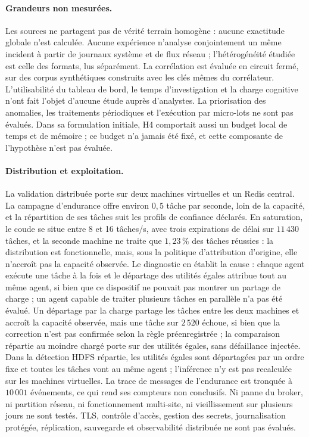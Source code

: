 \paragraph{Grandeurs non mesurées.}
Les sources ne partagent pas de vérité terrain homogène : aucune exactitude globale n'est
calculée. Aucune expérience n'analyse conjointement un même incident à partir de journaux
système et de flux réseau ; l'hétérogénéité étudiée est celle des formats, lus séparément.
La corrélation est évaluée en circuit fermé, sur des corpus synthétiques construits avec les
clés mêmes du corrélateur. L'utilisabilité du tableau de bord, le temps d'investigation et
la charge cognitive n'ont fait l'objet d'aucune étude auprès d'analystes. La priorisation
des anomalies, les traitements périodiques et l'exécution par micro-lots ne sont pas
évalués. Dans sa formulation initiale, H4 comportait aussi un budget local de temps et de
mémoire ; ce budget n'a jamais été fixé, et cette composante de l'hypothèse n'est pas évaluée.

\paragraph{Distribution et exploitation.}
La validation distribuée porte sur deux machines virtuelles et un Redis central. La
campagne d'endurance offre environ $0{,}5$ tâche par seconde, loin de la capacité, et la
répartition de ses tâches suit les profils de confiance déclarés. En saturation, le coude se
situe entre 8 et 16 tâches/s, avec trois expirations de délai sur $11\,430$ tâches, et la
seconde machine ne traite que $1{,}23\,\%$ des tâches réussies : la distribution est
fonctionnelle, mais, sous la politique d'attribution d'origine, elle n'accroît pas la capacité observée. Le diagnostic en établit la
cause : chaque agent exécute une tâche à la fois et le départage des utilités égales attribue
tout au même agent, si bien que ce dispositif ne pouvait pas montrer un partage de charge ;
un agent capable de traiter plusieurs tâches en parallèle n'a pas été évalué. Un départage par la charge partage les tâches entre les
deux machines et accroît la capacité observée, mais une tâche sur $2\,520$ échoue, si bien que la correction n'est pas confirmée
selon la règle préenregistrée ; la comparaison répartie au moindre chargé porte sur des utilités égales, sans défaillance injectée. Dans la détection HDFS
répartie, les utilités égales sont départagées par un ordre fixe et toutes les tâches vont
au même agent ; l'inférence n'y est pas recalculée sur les machines virtuelles. La trace de
messages de l'endurance est tronquée à $10\,001$ événements, ce qui rend ses compteurs non
conclusifs. Ni panne du broker, ni partition réseau, ni fonctionnement multi-site, ni
vieillissement sur plusieurs jours ne sont testés. TLS, contrôle d'accès, gestion des
secrets, journalisation protégée, réplication, sauvegarde et observabilité distribuée ne
sont pas évalués.

